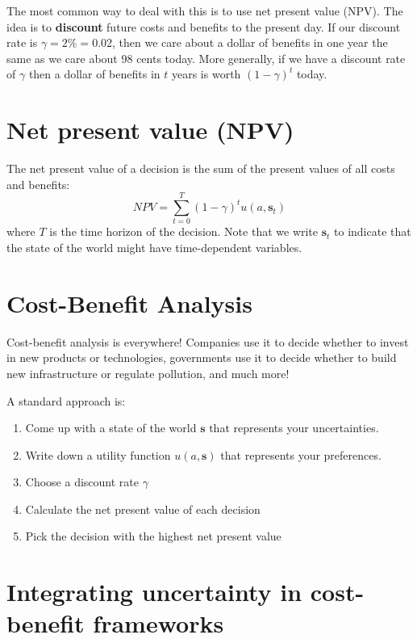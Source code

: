 \documentclass[
  letterpaper,
  DIV=11,
  numbers=noendperiod]{scrreprt}
\providecommand{\tightlist}{%
  \setlength{\itemsep}{0pt}\setlength{\parskip}{0pt}}
\begin{document}
The most common way to deal with this is to use net present value (NPV).
The idea is to \textbf{discount} future costs and benefits to the
present day. If our discount rate is \(\gamma = 2\% = 0.02\), then we
care about a dollar of benefits in one year the same as we care about 98
cents today. More generally, if we have a discount rate of \(\gamma\)
then a dollar of benefits in \(t\) years is worth \((1 - \gamma) ^ t\)
today.

\section{Net present value (NPV)}\label{net-present-value-npv}

The net present value of a decision is the sum of the present values of
all costs and benefits: \[
NPV = \sum_{t=0}^T (1 - \gamma)^t u(a, \mathbf{s}_t)
\] where \(T\) is the time horizon of the decision. Note that we write
\(\mathbf{s}_t\) to indicate that the state of the world might have
time-dependent variables.

\section{Cost-Benefit Analysis}\label{cost-benefit-analysis}

Cost-benefit analysis is everywhere! Companies use it to decide whether
to invest in new products or technologies, governments use it to decide
whether to build new infrastructure or regulate pollution, and much
more!

A standard approach is:

\begin{enumerate}
\def\labelenumi{\arabic{enumi}.}
\tightlist
\item
  Come up with a state of the world \(\mathbf{s}\) that represents your
  uncertainties.
\item
  Write down a utility function \(u(a, \mathbf{s})\) that represents
  your preferences.
\item
  Choose a discount rate \(\gamma\)
\item
  Calculate the net present value of each decision
\item
  Pick the decision with the highest net present value
\end{enumerate}

\section{Integrating uncertainty in cost-benefit
frameworks}\label{integrating-uncertainty-in-cost-benefit-frameworks}
\end{document}
